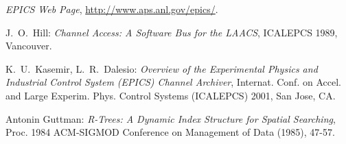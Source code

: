 
\begin{thebibliography}{99}

\emph{EPICS Web Page},
\href{http://www.aps.anl.gov/epics/}{http://www.aps.anl.gov/epics/}.

J.~O.~Hill:
\emph{Channel Access: A Software Bus for the LAACS},
ICALEPCS 1989, Vancouver.

K.~U.~Kasemir, L.~R.~Dalesio:
\emph{Overview of the Experimental Physics and Industrial Control System (EPICS) Channel Archiver},
Internat. Conf. on Accel. and Large Experim. Phys. Control Systems (ICALEPCS) 2001, San Jose, CA.

Antonin Guttman:
\emph{R-Trees: A Dynamic Index Structure for Spatial Searching},
Proc. 1984 ACM-SIGMOD Conference on Management of Data (1985), 47-57.

\end{thebibliography}
